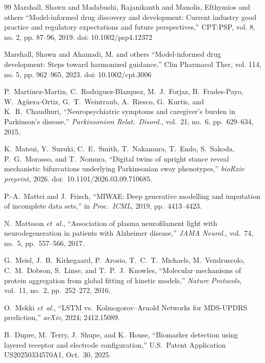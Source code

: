 \begin{thebibliography}{99}
 Marshall, Shawn and Madabushi, Rajanikanth and Manolis, Efthymios and others ``Model-informed drug discovery and development: Current industry good practice and regulatory expectations and future perspectives,'' CPT:PSP, vol. 8, no. 2, pp. 87--96, 2019. doi: 10.1002/psp4.12372

 Marshall, Shawn and Ahamadi, M. and others ``Model-informed drug development: Steps toward harmonized guidance,'' Clin Pharmacol Ther, vol. 114, no. 5, pp. 962--965, 2023. doi: 10.1002/cpt.3006

P.~Martinez-Martin, C.~Rodriguez-Blazquez, M.~J.~Forjaz, B.~Frades-Payo, W.~Ag{\"u}era-Ortiz, G.~T.~Weintraub, A.~Riesco, G.~Kurtis, and K.~R.~Chaudhuri, ``Neuropsychiatric symptoms and caregiver's burden in Parkinson's disease,'' \textit{Parkinsonism Relat.\ Disord.}, vol.~21, no.~6, pp.~629--634, 2015.

K.~Matsui, Y.~Suzuki, C.~E.~Smith, T.~Nakamura, T.~Endo, S.~Sakoda, P.~G.~Morasso, and T.~Nomura, ``Digital twins of upright stance reveal mechanistic bifurcations underlying Parkinsonian sway phenotypes,'' \textit{bioRxiv preprint}, 2026. doi:~10.1101/2026.03.09.710685.


P.-A.~Mattei and J.~Frisch, ``MIWAE: Deep generative modelling and imputation of incomplete data sets,'' in \textit{Proc.\ ICML}, 2019, pp.~4413--4423.

N.~Mattsson \textit{et~al.}, ``Association of plasma neurofilament light with neurodegeneration in patients with Alzheimer disease,'' \textit{JAMA Neurol.}, vol.~74, no.~5, pp.~557--566, 2017.

G.~Meisl, J.~B.~Kirkegaard, P.~Arosio, T.~C.~T.~Michaels, M.~Vendruscolo, C.~M.~Dobson, S.~Linse, and T.~P.~J.~Knowles, ``Molecular mechanisms of protein aggregation from global fitting of kinetic models,'' \textit{Nature Protocols}, vol.~11, no.~2, pp.~252--272, 2016.

O.~Mekki \textit{et~al.}, ``LSTM vs.\ Kolmogorov--Arnold Networks for MDS-UPDRS prediction,'' \textit{arXiv}, 2024; 2412.15089.

B.~Dupre, M.~Terry, J.~Shupe, and K.~House, ``Biomarker detection using layered receptor and electrode configuration,'' U.S.\ Patent Application US20250334570A1, Oct.~30, 2025.


\end{thebibliography}
